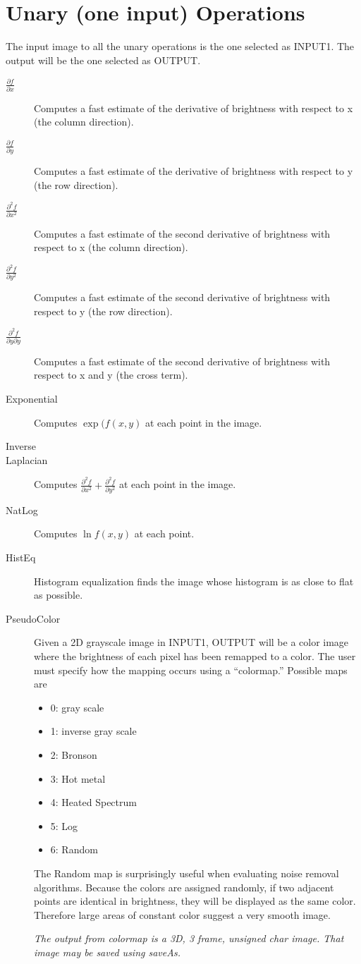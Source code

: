 \documentclass[11pt]{amsart}
\begin{document}
\section{Unary (one input) Operations}
The input image to all the unary operations is the one selected as INPUT1. The output will be the one selected as OUTPUT.
\begin{description}
\item[$\frac{\partial f}{\partial x}$] Computes a fast estimate of the  derivative of brightness with respect to x (the column direction).
\item[$\frac{\partial f}{\partial y}$] Computes a fast estimate of the  derivative of brightness with respect to y (the row direction).
\item[$\frac{\partial^2 f}{\partial x^2}$] Computes a fast estimate of the  second derivative of brightness with respect to x (the column direction).
\item[$\frac{\partial^2 f}{\partial y^2}$]Computes a fast estimate of the  second derivative of brightness with respect to y (the row direction).
\item[$\frac{\partial^2 f}{\partial y\partial y}$] Computes a fast estimate of the  second derivative of brightness with respect to x and y (the cross term).
\item[Exponential] Computes $\exp (f(x,y)$ at each point in the image.
\item[Inverse]
\item[Laplacian] Computes $\frac{\partial^2 f}{\partial x^2} + \frac{\partial^2 f}{\partial y^2}$ at each point in the image.
\item[NatLog] Computes $\ln f(x,y)$ at each point.
\item[HistEq] Histogram equalization finds the image whose histogram is as close to flat as possible.
\item[PseudoColor] Given a 2D grayscale image in INPUT1, OUTPUT will be a color image where the brightness of each pixel has been remapped to a color. The user must specify how the mapping occurs using a ``colormap.'' Possible maps are
\begin{itemize}
\item 0: gray scale
\item 1: inverse gray scale
\item 2: Bronson
\item 3: Hot metal
\item 4: Heated Spectrum
\item 5: Log
\item 6: Random
\end{itemize}
The Random map is surprisingly useful when evaluating noise removal algorithms. Because the colors are assigned randomly, if two adjacent points are identical in brightness, they will be displayed as the same color. Therefore large areas of constant color suggest a very smooth image. 

{\em The output from colormap is a 3D, 3 frame, unsigned char image. That image may be saved using saveAs.}

\end{description}
\end{document}
